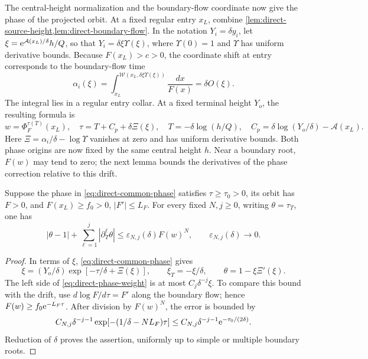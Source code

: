 The central-height normalization and the boundary-flow coordinate now
give the phase of the projected orbit. At a fixed regular entry
\(x_L\), combine \cref{lem:direct-source-height,lem:direct-boundary-flow}.
In the notation \(Y_i=\delta y_i\), let
\(\xi=\mathrm e^{\mathcal A(x_L)/\delta}h/Q\), so that
\(Y_i=\delta\xi \Upsilon(\xi)\), where \(\Upsilon(0)=1\) and \(\Upsilon\) has
uniform derivative bounds. Because \(F(x_L)>c>0\), the
coordinate shift at entry corresponds to the boundary-flow time
\[
 \alpha_i(\xi)
 =\int_{x_L}^{\mathcal W(x_L,\delta\xi \Upsilon(\xi))}\frac{dx}{F(x)}
 =\delta O(\xi).
\]
The integral lies in a regular entry collar. At a fixed
terminal height \(Y_o\), the resulting formula is
\begin{equation}
\label{eq:direct-common-phase}
 w=\Phi_F^{\tau(T)}(x_L),\quad
 \tau=T+C_p+\delta\Xi(\xi),\quad
 T=-\delta\log(h/Q),\quad
 C_p=\delta\log(Y_o/\delta)-\mathcal A(x_L).
\end{equation}
Here \(\Xi=\alpha_i/\delta-\log \Upsilon\) vanishes at zero and has
uniform derivative bounds. Both phase origins are now fixed by the same
central height \(h\). Near a boundary root, \(F(w)\) may tend to zero;
the next lemma bounds the derivatives of the phase correction relative
to this drift.

\begin{lemma}
\label{lem:direct-weighted-phase}
Suppose the phase in \eqref{eq:direct-common-phase} satisfies
\(\tau\ge\tau_0>0\), its orbit has \(F>0\), and
\(F(x_L)\ge f_0>0\), \(|F'|\le L_F\).
For every fixed \(N,j\ge0\), writing \(\theta=\tau_T\), one has
\begin{equation}
\label{eq:direct-phase-weight}
 |\theta-1|+\sum_{\ell=1}^j|\partial_T^\ell\theta|
       \le\varepsilon_{N,j}(\delta)F(w)^N,\qquad
 \varepsilon_{N,j}(\delta)\longrightarrow0 .
\end{equation}
\end{lemma}

\begin{proof}
In terms of \(\xi\), \eqref{eq:direct-common-phase} gives
\[
 \xi=(Y_o/\delta)\exp[-\tau/\delta+\Xi(\xi)],\qquad
 \xi_T=-\xi/\delta,\qquad \theta=1-\xi\Xi'(\xi).
\]
The left side of \eqref{eq:direct-phase-weight} is at most
\(C_j\delta^{-j}\xi\). To compare this bound with the drift, use
\(d\log F/d\tau=F'\) along the boundary flow; hence
\(F(w)\ge f_0\mathrm e^{-L_F\tau}\).
After division by \(F(w)^N\), the error is bounded by
\[
 C_{N,j}\delta^{-j-1}
       \exp[-(1/\delta-NL_F)\tau]
 \le C_{N,j}\delta^{-j-1}\mathrm e^{-\tau_0/(2\delta)}.
\]
Reduction of \(\delta\) proves the assertion, uniformly up to
simple or multiple boundary roots.
\end{proof}

